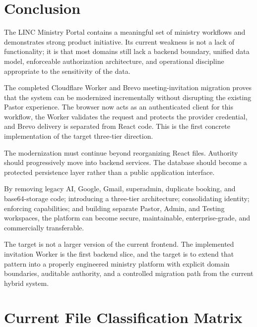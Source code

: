 \documentclass[11pt,a4paper,oneside]{report}
\begin{document}
\chapter{Conclusion}

The LINC Ministry Portal contains a meaningful set of ministry workflows and demonstrates strong product initiative. Its current weakness is not a lack of functionality; it is that most domains still lack a backend boundary, unified data model, enforceable authorization architecture, and operational discipline appropriate to the sensitivity of the data.

The completed Cloudflare Worker and Brevo meeting-invitation migration proves that the system can be modernized incrementally without disrupting the existing Pastor experience. The browser now acts as an authenticated client for this workflow, the Worker validates the request and protects the provider credential, and Brevo delivery is separated from React code. This is the first concrete implementation of the target three-tier direction.

The modernization must continue beyond reorganizing React files. Authority should progressively move into backend services. The database should become a protected persistence layer rather than a public application interface.

By removing legacy AI, Google, Gmail, superadmin, duplicate booking, and base64-storage code; introducing a three-tier architecture; consolidating identity; enforcing capabilities; and building separate Pastor, Admin, and Testing workspaces, the platform can become secure, maintainable, enterprise-grade, and commercially transferable.

\begin{infobox}
The target is not a larger version of the current frontend. The implemented invitation Worker is the first backend slice, and the target is to extend that pattern into a properly engineered ministry platform with explicit domain boundaries, auditable authority, and a controlled migration path from the current hybrid system.
\end{infobox}

\appendix
\chapter{Current File Classification Matrix}
\end{document}
